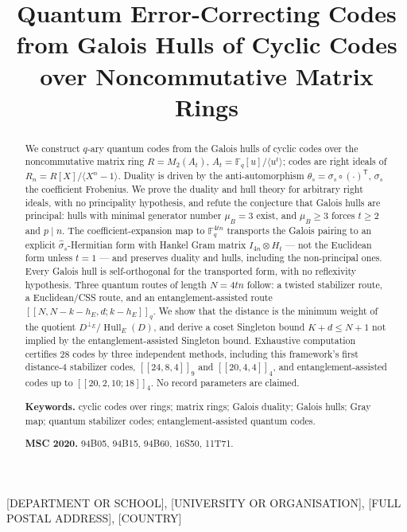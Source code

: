 \documentclass[11pt,a4paper]{article}
\title{Quantum Error-Correcting Codes from Galois Hulls of Cyclic
       Codes over Noncommutative Matrix Rings}
\author{\AUTHORONE}
\date{}
\newcommand{\F}{\mathbb F}
\newcommand{\Hull}{\operatorname{Hull}}
\newcommand{\MU}{\mu}
\theoremstyle{plain}
\theoremstyle{definition}
\theoremstyle{remark}
\newcommand{\AUTHORONEINST}{[DEPARTMENT OR SCHOOL]}
\newcommand{\AUTHORONEORG}{[UNIVERSITY OR ORGANISATION]}
\newcommand{\AUTHORONEADDR}{[FULL POSTAL ADDRESS]}
\newcommand{\AUTHORONECOUNTRY}{[COUNTRY]}
\newcommand{\AFFILIATIONBLOCK}{%
  \begin{center}\small
  \AUTHORONEINST, \AUTHORONEORG, \AUTHORONEADDR, \AUTHORONECOUNTRY
  \end{center}}
\begin{document}
\maketitle
\AFFILIATIONBLOCK

\begin{abstract}
We construct $q$-ary quantum codes from the Galois hulls of cyclic codes over
the noncommutative matrix ring $R=M_2(A_t)$,
$A_t=\F_q[u]/\langle u^t\rangle$; codes are right ideals of
$R_n=R[X]/\langle X^n-1\rangle$.  Duality is driven by the anti-automorphism
$\theta_s=\sigma_s\circ(\cdot)^{\mathsf T}$, $\sigma_s$ the coefficient
Frobenius.  We prove the duality and hull theory for arbitrary right ideals,
with no principality hypothesis, and refute the conjecture that Galois hulls
are principal: hulls with minimal generator number $\MU_B=3$ exist, and
$\MU_B\ge3$ forces $t\ge2$ and $p\mid n$.  The coefficient-expansion map to
$\F_q^{4tn}$ transports the Galois pairing to an explicit
$\widehat\sigma_s$-Hermitian form with Hankel Gram matrix
$I_{4n}\otimes H_t$ --- not the Euclidean form unless $t=1$ --- and preserves
duality and hulls, including the non-principal ones.  Every Galois hull is
self-orthogonal for the transported form, with no reflexivity hypothesis.
Three quantum routes of length $N=4tn$ follow: a twisted stabilizer route, a
Euclidean/CSS route, and an entanglement-assisted route
$[[N,N-k-h_E,d;k-h_E]]_q$.  We show that the distance is the minimum weight of
the quotient $D^{\perp_E}/\Hull_E(D)$, and derive a coset Singleton bound
$K+d\le N+1$ not implied by the entanglement-assisted Singleton bound.
Exhaustive computation certifies $28$ codes by three independent methods,
including this framework's first distance-$4$ stabilizer codes,
$[[24,8,4]]_9$ and $[[20,4,4]]_4$, and entanglement-assisted codes up
to $[[20,2,10;18]]_4$.  No record parameters are claimed.

\smallskip
\noindent\textbf{Keywords.} cyclic codes over rings; matrix rings; Galois
duality; Galois hulls; Gray map; quantum stabilizer codes;
entanglement-assisted quantum codes.

\smallskip
\noindent\textbf{MSC 2020.} 94B05, 94B15, 94B60, 16S50, 11T71.
\end{abstract}

\tableofcontents
\bigskip











\end{document}
